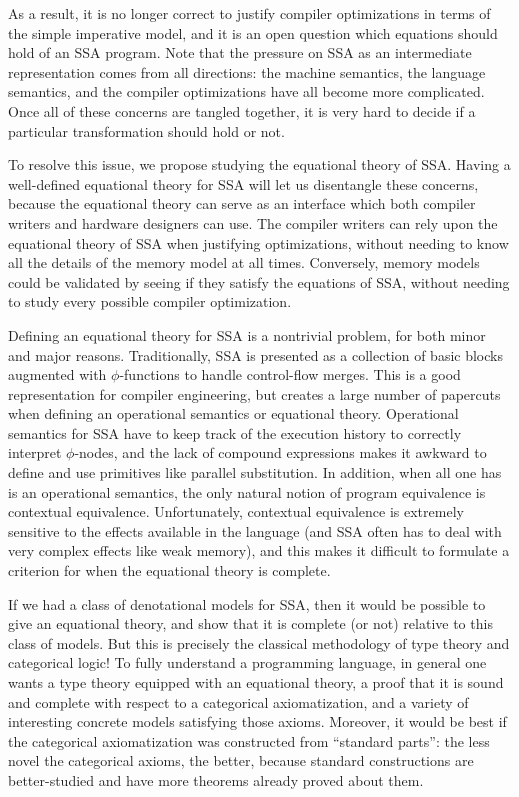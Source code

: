 \documentclass[acmsmall,screen,review]{acmart}
\begin{document}
As a result, it is no longer correct to justify compiler optimizations in terms of the simple imperative
model, and it is an open question which equations should hold of an SSA program. Note that the pressure
on SSA as an intermediate representation comes from all directions: the machine semantics, the language
semantics, and the compiler optimizations have all become more complicated. Once all of these concerns
are tangled together, it is very hard to decide if a particular transformation should hold or not. 

To resolve this issue, we propose studying the equational theory of SSA. Having a well-defined
equational theory for SSA will let us disentangle these concerns, because the equational theory can
serve as an interface which both compiler writers and hardware designers can use. The compiler writers
can rely upon the equational theory of SSA when justifying optimizations, without needing to know all
the details of the memory model at all times.  Conversely, memory models could be validated by
seeing if they satisfy the equations of SSA, without needing to study every possible compiler
optimization.

Defining an equational theory for SSA is a nontrivial problem, for both minor and major
reasons.  Traditionally, SSA is presented as a collection of basic blocks augmented with
$\phi$-functions to handle control-flow merges. This is a good representation for compiler
engineering, but creates a large number of papercuts when defining an operational semantics or
equational theory.  Operational semantics for SSA have to keep track of the execution history
to correctly interpret $\phi$-nodes, and the lack of compound expressions makes it awkward to
define and use primitives like parallel substitution. In addition, when all one has is an
operational semantics, the only natural notion of program equivalence is contextual
equivalence. Unfortunately, contextual equivalence is extremely sensitive to the effects
available in the language (and SSA often has to deal with very complex effects like weak
memory), and this makes it difficult to formulate a criterion for when the equational theory
is complete.

If we had a class of denotational models for SSA, then it would be possible to give an
equational theory, and show that it is complete (or not) relative to this class of models. But
this is precisely the classical methodology of type theory and categorical logic! To fully
understand a programming language, in general one wants a type theory equipped with an
equational theory, a proof that it is sound and complete with respect to a categorical
axiomatization, and a variety of interesting concrete models satisfying those axioms.
Moreover, it would be best if the categorical axiomatization was constructed from ``standard
parts'': the less novel the categorical axioms, the better, because standard constructions
are better-studied and have more theorems already proved about them. 
\end{document}
